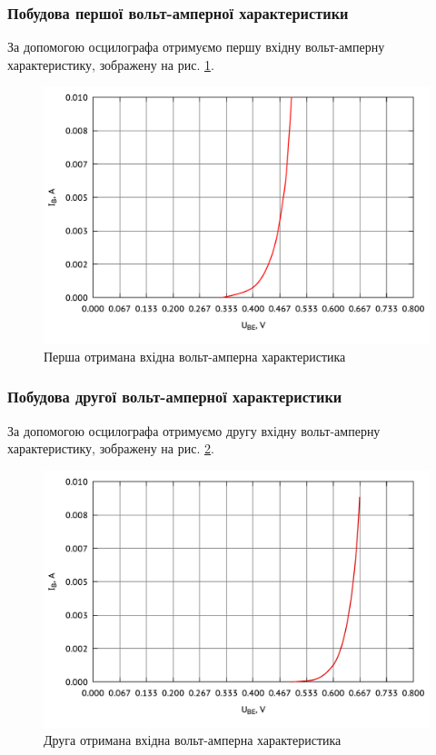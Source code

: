 \documentclass[a4paper,oneside,12pt,DIV=12,titlepage]{scrartcl}
\begin{document}
			\subsubsection{Побудова першої вольт-амперної характеристики}
				За допомогою осцилографа отримуємо першу вхідну вольт-амперну характеристику, зображену на рис. \ref{fig:graph001}.
				
				\begin{figure}[h]
					\centering
					\includegraphics[width=0.45\textheight]{graph001-0.pdf}
					\caption{Перша отримана вхідна вольт-амперна характеристика}
					\label{fig:graph001}
				\end{figure}
				
			\subsubsection{Побудова другої вольт-амперної характеристики}
				За допомогою осцилографа отримуємо другу вхідну вольт-амперну характеристику, зображену на рис. \ref{fig:graph002}.
				
				\begin{figure}[h]
					\centering
					\includegraphics[width=0.45\textheight]{graph002-0.pdf}
					\caption{Друга отримана вхідна вольт-амперна характеристика}
					\label{fig:graph002}
				\end{figure}
				
\end{document}
